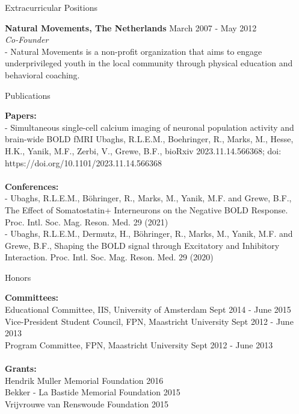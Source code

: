 \documentclass{resume}
\begin{document}
\begin{sections}{Extracurricular Positions}

{\bf Natural Movements, The Netherlands} \hfill {March 2007 - May 2012} 
\\{\textit{Co-Founder}}
\\- Natural Movements is a non-profit organization that aims to engage underprivileged youth in the local community through physical education and behavioral coaching.

\end{sections}

\begin{sections}{Publications}

{\bf Papers:}
\\
{- Simultaneous single-cell calcium imaging of neuronal population activity and brain-wide BOLD fMRI
Ubaghs, R.L.E.M., Boehringer, R., Marks, M., Hesse, H.K., Yanik, M.F., Zerbi, V., Grewe, B.F., bioRxiv 2023.11.14.566368; doi: https://doi.org/10.1101/2023.11.14.566368}
\\
\\
{\bf Conferences:}
\\{- Ubaghs, R.L.E.M., Böhringer, R., Marks, M., Yanik, M.F. and Grewe, B.F., The Effect of Somatostatin+ Interneurons on the Negative BOLD Response. Proc. Intl. Soc. Mag. Reson. Med. 29 (2021)}
\\{- Ubaghs, R.L.E.M., Dermutz, H., Böhringer, R., Marks, M., Yanik, M.F. and Grewe, B.F., Shaping the BOLD signal through Excitatory and Inhibitory Interaction. Proc. Intl. Soc. Mag. Reson. Med. 29 (2020)}

\end{sections}

\begin{sections}{Honors}

{\bf Committees:}
\\
{Educational Committee, IIS, University of Amsterdam} \hfill {Sept 2014 - June 2015} 
\\
{Vice-President Student Council, FPN, Maastricht University} \hfill {Sept 2012 - June 2013} 
\\
{Program Committee, FPN, Maastricht University} \hfill {Sept 2012 - June 2013}
\\
\\
{\bf Grants:}
\\
{Hendrik Muller Memorial Foundation} \hfill {2016}
\\
{Bekker - La Bastide Memorial Foundation} \hfill {2015}
\\
{Vrijvrouwe van Renswoude Foundation} \hfill {2015}

\end{sections}
\end{document}
